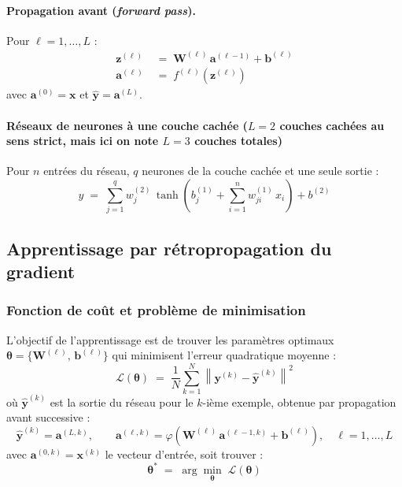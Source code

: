 \paragraph{Propagation avant (\textit{forward pass}).}
Pour $\ell = 1, \ldots, L$ :
\begin{align}
	\mathbf{z}^{(\ell)} &\;=\;
	\mathbf{W}^{(\ell)}\,\mathbf{a}^{(\ell-1)} + \mathbf{b}^{(\ell)}
	\label{eq:preactivation} \\[4pt]
	\mathbf{a}^{(\ell)} &\;=\;
	f^{(\ell)}\!\left(\mathbf{z}^{(\ell)}\right)
	\label{eq:activation_vect}
\end{align}
avec $\mathbf{a}^{(0)} = \mathbf{x}$ et
$\hat{\mathbf{y}} = \mathbf{a}^{(L)}$.

\paragraph{Réseaux de neurones à une couche cachée ($L = 2$ couches cachées au sens strict, mais ici on note $L=3$ couches totales)}
Pour $n$ entrées du réseau, $q$ neurones de la couche cachée et une seule sortie :
\begin{equation}
	\hat{y} \;=\; \sum_{j=1}^{q} w_j^{(2)}\,
	\tanh\!\left( b_j^{(1)}
	+ \sum_{i=1}^{n} w_{ji}^{(1)}\,x_i \right)
	+ b^{(2)}
	\label{eq:PMC_scalaire}
\end{equation}

\subsection{Apprentissage par rétropropagation du gradient}

\subsubsection*{Fonction de coût et problème de minimisation}

L'objectif de l'apprentissage est de trouver les paramètres optimaux 
$\boldsymbol{\theta} = \{\mathbf{W}^{(\ell)},\, \mathbf{b}^{(\ell)}\}$
qui minimisent l'erreur quadratique moyenne :
\begin{equation}
	\mathcal{L}(\boldsymbol{\theta}) \;=\;
	\frac{1}{N}\sum_{k=1}^{N}
	\left\| \mathbf{y}^{(k)} - \hat{\mathbf{y}}^{(k)} \right\|^2
	\label{eq:MSE}
\end{equation}
où $\hat{\mathbf{y}}^{(k)}$ est la sortie du réseau pour le $k$-ième exemple,
obtenue par propagation avant successive :
\begin{equation}
	\hat{\mathbf{y}}^{(k)} = \mathbf{a}^{(L,k)}, \qquad
	\mathbf{a}^{(\ell,k)} = \varphi\!\left(
	\mathbf{W}^{(\ell)}\,\mathbf{a}^{(\ell-1,k)} + \mathbf{b}^{(\ell)}
	\right), \quad \ell = 1,\ldots,L
	\label{eq:forward}
\end{equation}
avec $\mathbf{a}^{(0,k)} = \mathbf{x}^{(k)}$ le vecteur d'entrée,
soit trouver :
\[
\boldsymbol{\theta}^* \;=\; \arg\min_{\boldsymbol{\theta}}\;
\mathcal{L}(\boldsymbol{\theta})
\]

